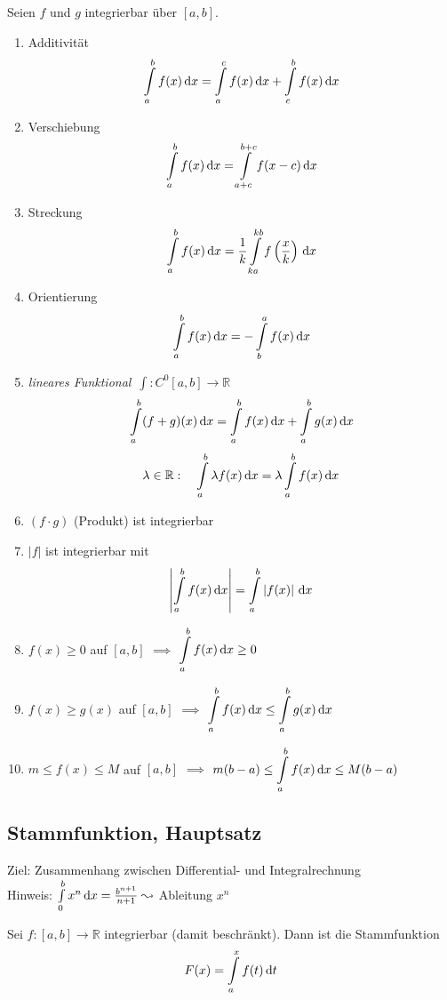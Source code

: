 
\begin{theorem}
  Seien $f$ und $g$ integrierbar über $[a,b]$.
  \begin{enumerate}
    \item Additivität \[ \int\limits_a^b f(x)\,\mathrm d x = \int\limits_a^c f(x)\,\mathrm d x + \int\limits_c^b f(x)\, \mathrm d x \]
    \item Verschiebung \[ \int\limits_a^b f(x)\,\mathrm d x = \int\limits_{a+c}^{b+c} f(x-c)\,\mathrm d x \]
    \item Streckung  \[ \int\limits_a^b f(x)\,\mathrm d x = \frac 1 k \int\limits_{ka}^{kb} f\left(\frac x k\right)\,\mathrm d x \]
    \item Orientierung \[ \int\limits_a^b f(x)\,\mathrm d x = - \int\limits_b^a f(x)\,\mathrm d x \]
    \item \emph{lineares Funktional}\ $\int: C^0[a,b] \to \mathbb{R}$
      \[ \int\limits_a^b (f+g)(x)\,\mathrm d x = \int\limits_a^b f(x)\,\mathrm d x + \int\limits_a^b g(x)\,\mathrm d x \]
      \[ \lambda \in \mathbb{R}: \quad \int\limits_a^b \lambda f(x)\,\mathrm d x  = \lambda \int\limits_a^b f(x)\,\mathrm d x \]
    \item $(f \cdot g)$ (Produkt) ist integrierbar
    \item $\left| f \right|$ ist integrierbar mit
      \[ \left| \int\limits_a^b f(x)\,\mathrm d x\right| = \int\limits_a^b \left| f(x) \right| \,\mathrm d x \]
    \item $f(x) \geq 0$ auf $[a,b]$ $\implies$ $\displaystyle \int\limits_a^b f(x)\,\mathrm d x \geq 0$
    \item $f(x) \geq g(x)$ auf $[a,b]$ $\implies$ $\displaystyle \int\limits_a^b f(x)\,\mathrm d x \leq \int\limits_a^b g(x)\,\mathrm d x$
    \item $m \leq f(x) \leq M$ auf $[a,b]$ $\implies$ $\displaystyle m(b-a) \leq \int\limits_a^b f(x)\,\mathrm d x \leq M(b-a)$
  \end{enumerate}
\end{theorem}

\subsection{Stammfunktion, Hauptsatz}

Ziel: Zusammenhang zwischen Differential- und Integralrechnung\\
Hinweis: $\int\limits_0^b x^n\,\mathrm d x = \frac{b^{n+1}}{n+1} \leadsto$ Ableitung $x^n$

\begin{definition}[Stammfunktion $F$]
  Sei $f: [a,b] \to \mathbb{R}$ integrierbar (damit beschränkt). Dann ist die Stammfunktion
  \[ F(x) = \int\limits_a^x f(t)\,\mathrm d t \]
\end{definition}

